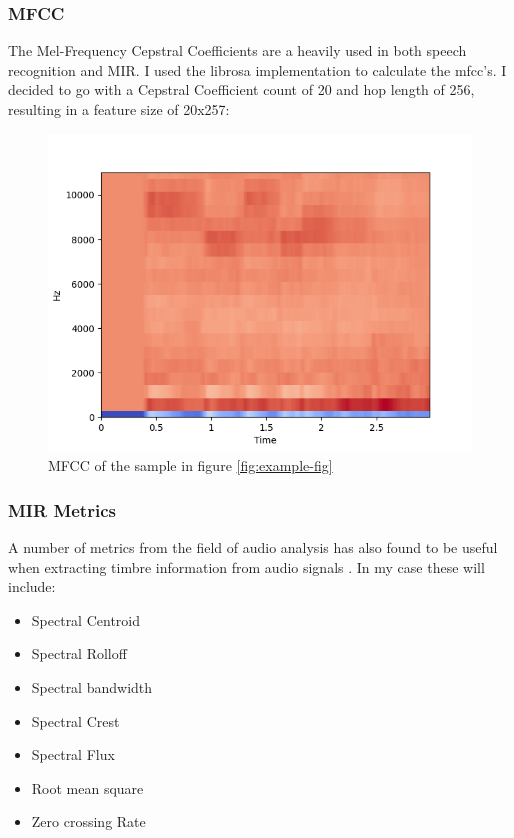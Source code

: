 \documentclass[11pt]{article}
\begin{document}
\subsubsection{MFCC}
\label{sec:org70aa9fd}

The Mel-Frequency Cepstral Coefficients are a heavily used in both speech recognition and MIR. \cite{medium,klustr,Racharla_2020,article}
I used the librosa implementation to calculate the mfcc's. I decided to go with a Cepstral Coefficient count of 20 and hop length of 256, resulting in a feature size of 20x257:

\begin{figure}[H]
\centering
\includegraphics[width=.7\linewidth]{./Figures/mfcc.png}
\caption{\label{fig:mfcc}MFCC of the sample in figure \ref{fig:example-fig}}
\end{figure}

\subsubsection{MIR Metrics}
\label{sec:orgb3249b0}

A number of metrics from the field of audio analysis has also found to be useful when extracting timbre information from audio signals \cite{article,klustr}. In my case these will include:

\begin{itemize}
\item Spectral Centroid
\item Spectral Rolloff
\item Spectral bandwidth
\item Spectral Crest
\item Spectral Flux
\item Root mean square
\item Zero crossing Rate
\end{itemize}
\end{document}

